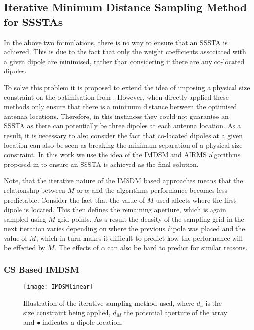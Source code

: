 \documentclass[10pt,final]{IEEEtran}
\begin{document}
\subsection{Iterative Minimum Distance Sampling Method for SSSTAs}\label{sub:IMDSM}
In the above two formulations, there is no way to ensure that an SSSTA is achieved.  This is due to the fact that only the weight coefficients associated with a given dipole are minimised, rather than considering if there are any co-located dipoles.

To solve this problem it is proposed to extend the idea of imposing a physical size constraint on the optimisation from \cite{Hawes14c}.  However, when directly applied these methods only ensure that there is a minimum distance between the optimised antenna locations.  Therefore, in this instances they could not guarantee an SSSTA as there can potentially be three dipoles at each antenna location.  As a result, it is necessary to also consider the fact that co-located dipoles at a given location can also be seen as breaking the minimum separation of a physical size constraint.  In this work we use the idea of the IMDSM and AIRMS algorithms proposed in \cite{Hawes14c} to ensure an SSSTA is achieved as the final solution.

Note, that the iterative nature of the IMSDM based approaches means that the relationship between $M$ or $\alpha$ and the algorithms performance becomes less predictable.  Consider the fact that the value of $M$ used affects where the first dipole is located.  This then defines the remaining aperture, which is again sampled using $M$ grid points.  As a result the density of the sampling grid in the next iteration varies depending on where the previous dipole was placed and the value of $M$, which in turn makes it difficult to predict how the performance will be effected by $M$.  The effects of $\alpha$ can also be hard to predict for similar reasons.


\subsubsection{CS Based IMDSM}
\begin{figure}
\begin{center}
   \texttt{[image: IMDSMlinear]}
   \caption{Illustration of the iterative sampling method used, where $d_{a}$ is the size constraint being applied, $d_{M}$ the potential aperture of the array and $\bullet$ indicates a dipole location.
    \label{fig:IMSDM}}
\end{center}
\end{figure}
\end{document}
